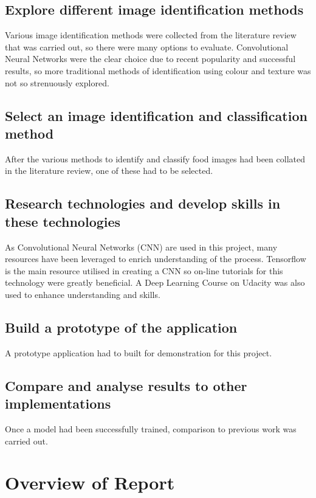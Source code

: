 \subsection*{Explore different image identification methods}
Various image identification methods were collected from the literature review
that was carried out, so there were many options to evaluate.
Convolutional Neural Networks were the clear choice due to recent popularity and successful results, so more traditional methods of identification using colour and texture was not so strenuously explored.

\subsection*{Select an image identification and classification method}
After the various methods to identify and classify food images had been collated in the literature review, one of these had to be selected.

\subsection*{Research technologies and develop skills in these technologies}
As Convolutional Neural Networks (CNN) are used in this project, many resources have been leveraged to enrich understanding of the process.
Tensorflow is the main resource utilised  in creating a CNN so on-line tutorials for this technology were greatly beneficial.
A Deep Learning Course on Udacity was also used to enhance understanding and skills.

\subsection*{Build a prototype of the application}
A prototype application had to built for demonstration for this project.

\subsection*{Compare and analyse results to other implementations}
Once a model had been successfully trained, comparison to previous work was carried out.

\section{Overview of Report}

